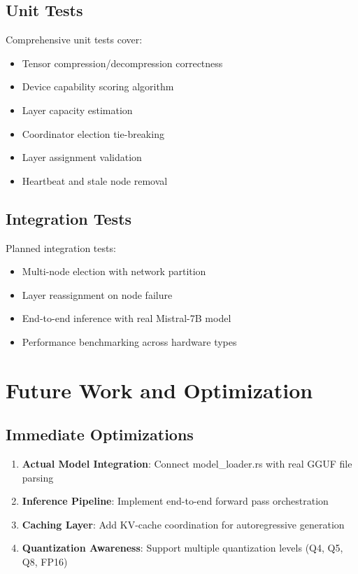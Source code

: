 \documentclass[12pt,a4paper]{article}
\begin{document}
\subsection{Unit Tests}

Comprehensive unit tests cover:
\begin{itemize}
    \item Tensor compression/decompression correctness
    \item Device capability scoring algorithm
    \item Layer capacity estimation
    \item Coordinator election tie-breaking
    \item Layer assignment validation
    \item Heartbeat and stale node removal
\end{itemize}

\subsection{Integration Tests}

Planned integration tests:
\begin{itemize}
    \item Multi-node election with network partition
    \item Layer reassignment on node failure
    \item End-to-end inference with real Mistral-7B model
    \item Performance benchmarking across hardware types
\end{itemize}

\section{Future Work and Optimization}

\subsection{Immediate Optimizations}

\begin{enumerate}
    \item \textbf{Actual Model Integration}: Connect model\_loader.rs with real GGUF file parsing
    \item \textbf{Inference Pipeline}: Implement end-to-end forward pass orchestration
    \item \textbf{Caching Layer}: Add KV-cache coordination for autoregressive generation
    \item \textbf{Quantization Awareness}: Support multiple quantization levels (Q4, Q5, Q8, FP16)
\end{enumerate}
\end{document}
